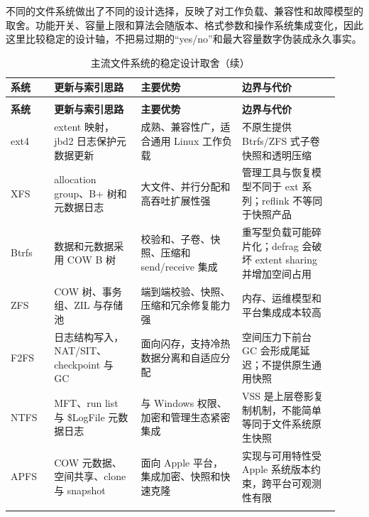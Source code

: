 \begin{filesystemlayout}

不同的文件系统做出了不同的设计选择，反映了对工作负载、兼容性和故障模型的取舍。功能开关、容量上限和算法会随版本、格式参数和操作系统集成变化，因此这里比较稳定的设计轴，不把易过期的“yes/no”和最大容量数字伪装成永久事实。

\begingroup
\small
\setlength{\tabcolsep}{3pt}
\begin{longtable}{|F{0.12\linewidth}|F{0.24\linewidth}|F{0.29\linewidth}|F{0.27\linewidth}|}
\caption{主流文件系统的稳定设计取舍}\\
\toprule
{}
\textbf{系统} & \textbf{更新与索引思路} & \textbf{主要优势} & \textbf{边界与代价} \\
\midrule
\endfirsthead
\caption[]{主流文件系统的稳定设计取舍（续）}\\
\toprule
{}
\textbf{系统} & \textbf{更新与索引思路} & \textbf{主要优势} & \textbf{边界与代价} \\
\midrule
\endhead
\bottomrule
\endfoot
ext4 & extent 映射，jbd2 日志保护元数据更新 & 成熟、兼容性广，适合通用 Linux 工作负载 & 不原生提供 Btrfs/ZFS 式子卷快照和透明压缩 \\\tablerowrule
XFS & allocation group、B+ 树和元数据日志 & 大文件、并行分配和高吞吐扩展性强 & 管理工具与恢复模型不同于 ext 系列；reflink 不等同于快照产品 \\\tablerowrule
Btrfs & 数据和元数据采用 COW B 树 & 校验和、子卷、快照、压缩和 send/receive 集成 & 重写型负载可能碎片化；defrag 会破坏 extent sharing 并增加空间占用 \\\tablerowrule
ZFS & COW 树、事务组、ZIL 与存储池 & 端到端校验、快照、压缩和冗余修复能力强 & 内存、运维模型和平台集成成本较高 \\\tablerowrule
F2FS & 日志结构写入，NAT/SIT、checkpoint 与 GC & 面向闪存，支持冷热数据分离和自适应分配 & 空间压力下前台 GC 会形成尾延迟；不提供原生通用快照 \\\tablerowrule
NTFS & MFT、run list 与 \$LogFile 元数据日志 & 与 Windows 权限、加密和管理生态紧密集成 & VSS 是上层卷影复制机制，不能简单等同于文件系统原生快照 \\\tablerowrule
APFS & COW 元数据、空间共享、clone 与 snapshot & 面向 Apple 平台，集成加密、快照和快速克隆 & 实现与可用特性受 Apple 系统版本约束，跨平台可观测性有限 \\\tablerowrule
\end{longtable}
\endgroup


\end{filesystemlayout}
